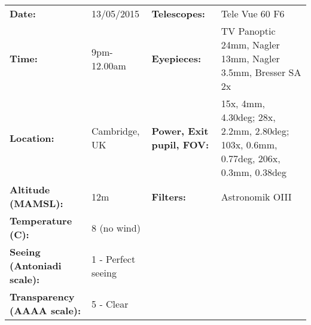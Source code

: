 \begin{tabular}{ p{1.7in} p{1.2in} p{1.5in} p{4.2in}}
{\bf Date:} & 13/05/2015 & {\bf Telescopes:} & Tele Vue 60 F6 \\ 
{\bf Time:} & 9pm-12.00am & {\bf Eyepieces:} & TV Panoptic 24mm, Nagler 13mm, Nagler 3.5mm, Bresser SA 2x \\ 
{\bf Location:} & Cambridge, UK & {\bf Power, Exit pupil, FOV:} & 15x, 4mm, 4.30deg; 28x, 2.2mm, 2.80deg; 103x, 0.6mm, 0.77deg, 206x, 0.3mm, 0.38deg \\ 
{\bf Altitude (MAMSL):} & 12m & {\bf Filters:} & Astronomik OIII \\ 
{\bf Temperature (C):} & 8 (no wind) & & \\ 
{\bf Seeing (Antoniadi scale):} & 1 - Perfect seeing & & \\ 
{\bf Transparency (AAAA scale):} & 5 - Clear & & \\ 
\end{tabular}
\centering 
